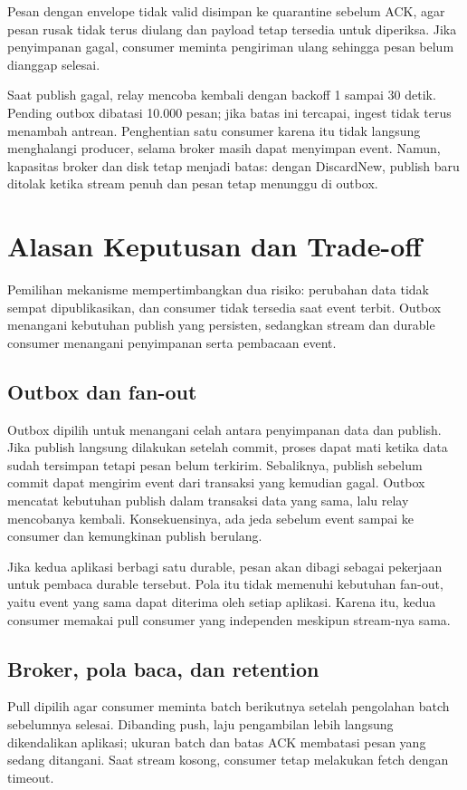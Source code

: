 Pesan dengan envelope tidak valid disimpan ke quarantine sebelum ACK, agar pesan rusak tidak terus diulang dan payload tetap tersedia untuk diperiksa. Jika penyimpanan gagal, consumer meminta pengiriman ulang sehingga pesan belum dianggap selesai.

Saat publish gagal, relay mencoba kembali dengan backoff 1 sampai 30 detik. Pending outbox dibatasi 10.000 pesan; jika batas ini tercapai, ingest tidak terus menambah antrean. Penghentian satu consumer karena itu tidak langsung menghalangi producer, selama broker masih dapat menyimpan event. Namun, kapasitas broker dan disk tetap menjadi batas: dengan DiscardNew, publish baru ditolak ketika stream penuh dan pesan tetap menunggu di outbox.

\section{Alasan Keputusan dan Trade-off}
Pemilihan mekanisme mempertimbangkan dua risiko: perubahan data tidak sempat dipublikasikan, dan consumer tidak tersedia saat event terbit. Outbox menangani kebutuhan publish yang persisten, sedangkan stream dan durable consumer menangani penyimpanan serta pembacaan event.

\subsection{Outbox dan fan-out}
Outbox dipilih untuk menangani celah antara penyimpanan data dan publish. Jika publish langsung dilakukan setelah commit, proses dapat mati ketika data sudah tersimpan tetapi pesan belum terkirim. Sebaliknya, publish sebelum commit dapat mengirim event dari transaksi yang kemudian gagal. Outbox mencatat kebutuhan publish dalam transaksi data yang sama, lalu relay mencobanya kembali. Konsekuensinya, ada jeda sebelum event sampai ke consumer dan kemungkinan publish berulang.

Jika kedua aplikasi berbagi satu durable, pesan akan dibagi sebagai pekerjaan untuk pembaca durable tersebut. Pola itu tidak memenuhi kebutuhan fan-out, yaitu event yang sama dapat diterima oleh setiap aplikasi. Karena itu, kedua consumer memakai pull consumer yang independen meskipun stream-nya sama.

\subsection{Broker, pola baca, dan retention}
Pull dipilih agar consumer meminta batch berikutnya setelah pengolahan batch sebelumnya selesai. Dibanding push, laju pengambilan lebih langsung dikendalikan aplikasi; ukuran batch dan batas ACK membatasi pesan yang sedang ditangani. Saat stream kosong, consumer tetap melakukan fetch dengan timeout.

